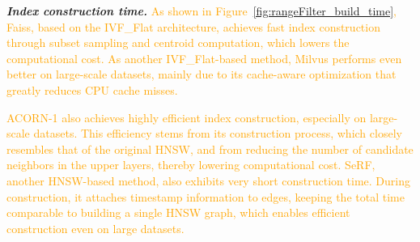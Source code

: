 \documentclass[sigconf, nonacm]{acmart}
\begin{document}
{	\textit{\textbf{Index construction time.}}
%
%	
	\textcolor{orange}{
	As shown in Figure~\ref{fig:rangeFilter_build_time}, Faiss, based on the IVF\_Flat architecture, achieves fast index construction through subset sampling and centroid computation, which lowers the computational cost. 
	As another IVF\_Flat-based method, Milvus performs even better on large-scale datasets, mainly due to its cache-aware optimization that greatly reduces CPU cache misses.}
	
		\textcolor{orange}{
	ACORN-1 also achieves highly efficient index construction, especially on large-scale datasets. This efficiency stems from its construction process, which closely resembles that of the original HNSW, and from reducing the number of candidate neighbors in the upper layers, thereby lowering computational cost. SeRF, another HNSW-based method, also exhibits very short construction time. During construction, it attaches timestamp information to edges, keeping the total time comparable to building a single HNSW graph, which enables efficient construction even on large datasets.}
	
}
\end{document}
